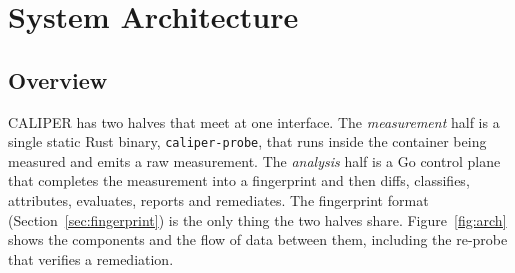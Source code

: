 \chapter{System Architecture}
\label{ch:architecture}

\section{Overview}

CALIPER has two halves that meet at one interface. The \emph{measurement} half is a single static Rust binary, \texttt{caliper-probe}, that runs inside the container being measured and emits a raw measurement. The \emph{analysis} half is a Go control plane that completes the measurement into a fingerprint and then diffs, classifies, attributes, evaluates, reports and remediates. The fingerprint format (Section~\ref{sec:fingerprint}) is the only thing the two halves share. Figure~\ref{fig:arch} shows the components and the flow of data between them, including the re-probe that verifies a remediation.

